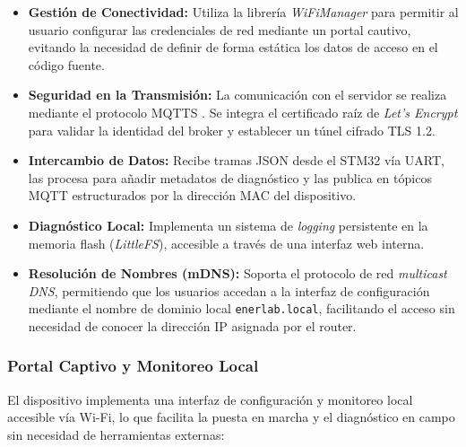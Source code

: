 \documentclass[12pt, a4paper]{article} %
\begin{document}
\begin{itemize}
  \item \textbf{Gestión de Conectividad:} Utiliza la librería \textit{WiFiManager} para permitir al usuario configurar las credenciales de red mediante un portal cautivo, evitando la necesidad de definir de forma estática los datos de acceso en el código fuente.
  \item \textbf{Seguridad en la Transmisión:} La comunicación con el servidor se realiza mediante el protocolo MQTTS \cite{mqtt_spec}. Se integra el certificado raíz de \textit{Let's Encrypt} para validar la identidad del broker y establecer un túnel cifrado TLS 1.2.

  \item \textbf{Intercambio de Datos:} Recibe tramas JSON desde el STM32 vía UART, las procesa para añadir metadatos de diagnóstico y las publica en tópicos MQTT estructurados por la dirección MAC del dispositivo.
  \item \textbf{Diagnóstico Local:} Implementa un sistema de \textit{logging} persistente en la memoria flash (\textit{LittleFS}), accesible a través de una interfaz web interna.
  \item \textbf{Resolución de Nombres (mDNS):} Soporta el protocolo de red \textit{multicast DNS}, permitiendo que los usuarios accedan a la interfaz de configuración mediante el nombre de dominio local \texttt{enerlab.local}, facilitando el acceso sin necesidad de conocer la dirección IP asignada por el router.
\end{itemize}

\subsubsection{Portal Captivo y Monitoreo Local}

El dispositivo implementa una interfaz de configuración y monitoreo local accesible vía Wi-Fi, lo que facilita la puesta en marcha y el diagnóstico en campo sin necesidad de herramientas externas:
\end{document}
